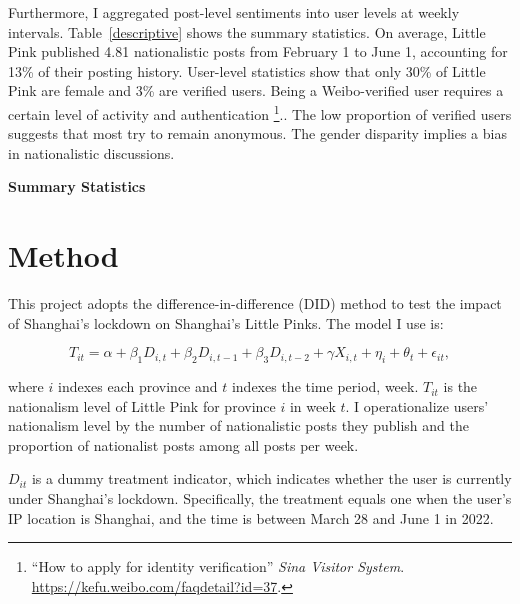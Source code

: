 \documentclass[12pt, ]{article}
\begin{document}
Furthermore, I aggregated post-level sentiments into user levels at weekly intervals. Table~\ref{descriptive} shows the summary statistics. On average, Little Pink published 4.81 nationalistic posts from February 1 to June 1, accounting for 13\% of their posting history. User-level statistics show that only 30\% of Little Pink are female and 3\% are verified users. Being a Weibo-verified user requires a certain level of activity and authentication \footnote{``How to apply for identity verification''  \emph{Sina Visitor System}.  \url{https://kefu.weibo.com/faqdetail?id=37}.}.. The low proportion of verified users suggests that most try to remain anonymous. The gender disparity implies a bias in nationalistic discussions.

\begin{table}
\caption{\textbf{Summary Statistics}}
\label{descriptive}

\end{table}



\hypertarget{method}{%
\section{Method}\label{method}}

This project adopts the difference-in-difference (DID) method to test the impact of Shanghai's lockdown on Shanghai's Little Pinks. The model I use is:

\[ T_{it} = \alpha + \beta_{1}D_{i,t} + \beta_{2}D_{i,t - 1} + \beta_{3}D_{i,t - 2} + \gamma X_{i,t} + \eta_{i} + \theta_{t} + \epsilon_{it}, \]

where \( i \) indexes each province and \( t \) indexes the time period, week. \( T_{it} \) is the nationalism level of Little Pink for province \( i \) in week \( t \). I operationalize users’ nationalism level by the number of nationalistic posts they publish and the proportion of nationalist posts among all posts per week.

\( D_{it} \) is a dummy treatment indicator, which indicates whether the user is currently under Shanghai’s lockdown. Specifically, the treatment equals one when the user’s IP location is Shanghai, and the time is between March 28 and June 1 in 2022.
\end{document}

